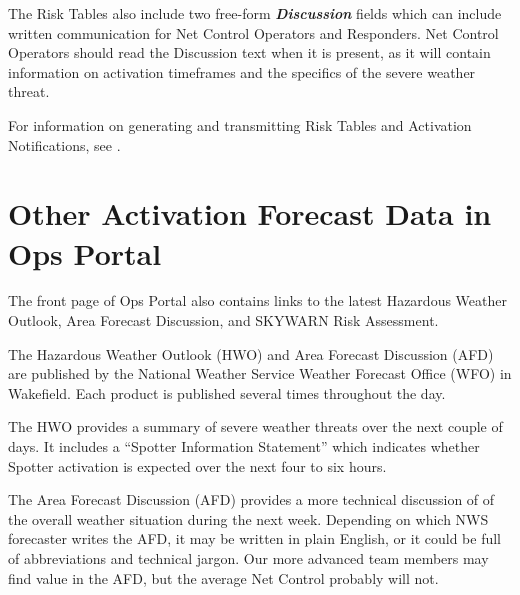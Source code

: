 \documentclass[pdflatex,letterpaper,twoside,12pt]{book}
\begin{document}
The Risk Tables also include two free-form \textbf{\emph{Discussion}} fields which can include written communication for Net Control Operators and Responders.  Net Control Operators should read the Discussion text when it is present, as it will contain information on activation timeframes and the specifics of the severe weather threat.

For information on generating and transmitting Risk Tables and Activation Notifications, see .


\section{Other Activation Forecast Data in Ops Portal}

The front page of Ops Portal also contains links to the latest Hazardous Weather Outlook, Area Forecast Discussion, and SKYWARN Risk Assessment.

The Hazardous Weather Outlook (HWO) and Area Forecast Discussion (AFD) are published by the National Weather Service Weather Forecast Office (WFO) in Wakefield.  Each product is published several times throughout the day.

The HWO provides a summary of severe weather threats over the next couple of days.  It includes a ``Spotter Information Statement'' which indicates whether Spotter activation is expected over the next four to six hours.


The Area Forecast Discussion (AFD) provides a more technical discussion of of the overall weather situation during the next week.  Depending on which NWS forecaster writes the AFD, it may be written in plain English, or it could be full of abbreviations and technical jargon.  Our more advanced team members may find value in the AFD, but the average Net Control probably will not.
\end{document}
